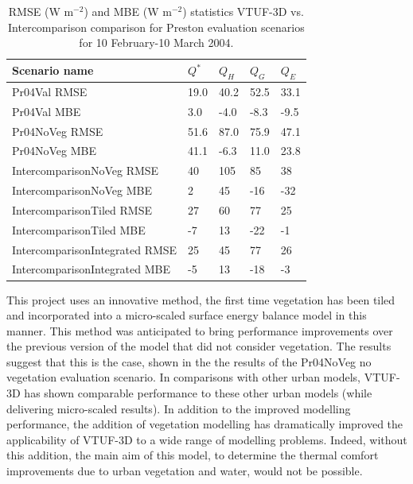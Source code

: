 \documentclass[final,3p,times,authoryear]{elsarticle}
\begin{document}
 \begin{center}
 \begin{table}[!htbp]
 \caption{RMSE (W m$^{-2}$) and MBE (W m$^{-2}$) statistics VTUF-3D vs. Intercomparison \citep{Best2012} comparison for Preston evaluation scenarios for 10 February-10 March 2004.\label{fig:prestonrmse}} 
 \begin{tabular}{  | l | l | l|l|l| } 
 \hline \textbf{Scenario name} &\textbf{$Q^{*}$}& \textbf{$Q_{H}$}& \textbf{$Q_{G}$}& \textbf{$Q_{E}$}  \\ \hline
 Pr04Val RMSE & 19.0&	40.2&	52.5&	33.1    \\ \hline
   Pr04Val MBE & 3.0&	-4.0&	-8.3&	-9.5    \\ \hline
 Pr04NoVeg RMSE & 51.6&	87.0&	75.9&	47.1  \\ \hline	
   Pr04NoVeg MBE & 41.1&	-6.3&	11.0&	23.8  \\ \hline	
 IntercomparisonNoVeg RMSE & 40&	105&	85&	38   \\ \hline
   IntercomparisonNoVeg MBE & 2&	45&	-16& -32   \\ \hline
 IntercomparisonTiled RMSE &  27&	60&	77&	25  \\ \hline
   IntercomparisonTiled MBE & -7&	13&	-22& -1  \\ \hline
 IntercomparisonIntegrated RMSE & 25&	45&	77&	26   \\ \hline
   IntercomparisonIntegrated MBE & -5&	13&	-18& -3   \\ \hline
 
   \end{tabular} 
 \end{table}
 \end{center} 
 

This project uses an innovative method, the first time vegetation has been tiled and incorporated into a micro-scaled surface energy balance model in this manner. This method was anticipated to bring performance improvements over the previous version of the model that did not consider vegetation. The results suggest that this is the case, shown in the the results of the Pr04NoVeg no vegetation evaluation scenario. In comparisons with other urban models, VTUF-3D has shown comparable performance to these other urban models (while delivering micro-scaled results). In addition to the improved modelling performance, the addition of vegetation modelling has dramatically improved the applicability of VTUF-3D to a wide range of modelling problems. Indeed, without this addition, the main aim of this model, to determine the thermal comfort improvements due to urban vegetation and water, would not be possible. 
\end{document}
